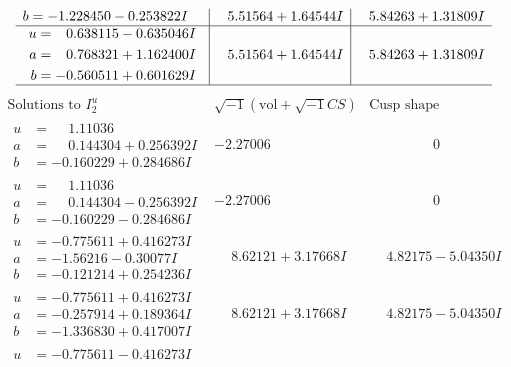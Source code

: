 \documentclass[1p]{elsarticle_modified}
\theoremstyle{definition}
\newcommand{\I}{\sqrt{-1}}
\begin{document}
$$\begin{array}{c|c|c}
\begin{aligned}
b &= -1.228450 - 0.253822 I\end{aligned}
 & \phantom{-}5.51564 + 1.64544 I & \phantom{-}5.84263 + 1.31809 I \\ \hline\begin{aligned}
u &= \phantom{-}0.638115 - 0.635046 I \\
a &= \phantom{-}0.768321 + 1.162400 I \\
b &= -0.560511 + 0.601629 I\end{aligned}
 & \phantom{-}5.51564 + 1.64544 I & \phantom{-}5.84263 + 1.31809 I\\
 \hline 
 \end{array}$$\newpage$$\begin{array}{c|c|c}  
\text{Solutions to }I^u_{2}& \I (\text{vol} + \sqrt{-1}CS) & \text{Cusp shape}\\
 \hline 
\begin{aligned}
u &= \phantom{-}1.11036\phantom{ +0.000000I} \\
a &= \phantom{-}0.144304 + 0.256392 I \\
b &= -0.160229 + 0.284686 I\end{aligned}
 & -2.27006\phantom{ +0.000000I} & \phantom{-0.000000 } 0 \\ \hline\begin{aligned}
u &= \phantom{-}1.11036\phantom{ +0.000000I} \\
a &= \phantom{-}0.144304 - 0.256392 I \\
b &= -0.160229 - 0.284686 I\end{aligned}
 & -2.27006\phantom{ +0.000000I} & \phantom{-0.000000 } 0 \\ \hline\begin{aligned}
u &= -0.775611 + 0.416273 I \\
a &= -1.56216 - 0.30077 I \\
b &= -0.121214 + 0.254236 I\end{aligned}
 & \phantom{-}8.62121 + 3.17668 I & \phantom{-}4.82175 - 5.04350 I \\ \hline\begin{aligned}
u &= -0.775611 + 0.416273 I \\
a &= -0.257914 + 0.189364 I \\
b &= -1.336830 + 0.417007 I\end{aligned}
 & \phantom{-}8.62121 + 3.17668 I & \phantom{-}4.82175 - 5.04350 I \\ \hline\begin{aligned}
u &= -0.775611 - 0.416273 I \\

\end{aligned}
\end{array}$$
\end{document}
